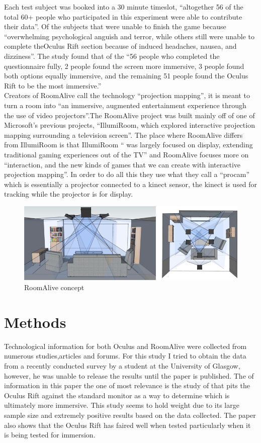 \documentclass[a4paper]{article}
\begin{document}
Each test subject was booked into a 30 minute timeslot, “altogether 56 of the total 60+ people who participated in this experiment were able to contribute their data”\cite{7}. Of the subjects that were unable to finish the game because “overwhelming psychological anguish and terror, while others still were unable to complete theOculus Rift section because of induced headaches, nausea, and dizziness”\cite{7}. The study found that of the “56 people who completed the questionnaire fully, 2 people found the screen more immersive, 3 people found both options equally immersive, and the remaining 51 people found the Oculus Rift to be the most immersive.”\cite{7}\\
\indent Creators of RoomAlive call the technology “projection mapping”, it is meant to turn a room into “an immersive, augmented entertainment experience through the use of video projectors”\cite{6}.The RoomAlive project was built mainly off of one of Microsoft's previous projects, “IllumiRoom, which explored interactive projection mapping surrounding a television screen”\cite{6}. The place where RoomAlive differs from IllumiRoom is that IllumiRoom “ was largely focused on display, extending traditional gaming experiences out of the TV”\cite{6} and RoomAlive focuses more on “interaction, and the new kinds of games that we can create with interactive projection mapping”\cite{6}. In order to do all this they use what they call a “procam” which is essentially a projector connected to a kinect sensor, the kinect is used for tracking while the projector is for display.

\begin{figure}
\centering
\includegraphics[scale=0.4]{roomalive.jpg}
\caption{RoomAlive concept}
\end{figure}



\section{Methods}

\indent\indent Technological information for both Oculus and RoomAlive were collected from numerous studies,articles and forums. For this study I tried to obtain the data from a recently conducted survey\cite{8} by a student at the University of Glasgow, however, he was unable to release the results until the paper is published. The of information in this paper the one of most relevance is the study of that pits the Oculus Rift against the standard monitor as a way to determine which is ultimately more immersive. This study seems to hold weight due to its large sample size and extremely positive results based on the data collected. The paper also shows that the Oculus Rift has faired well when tested particularly when it is being tested for immersion.
\end{document}
